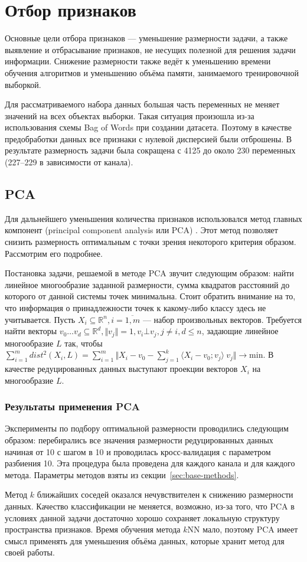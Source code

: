 \section{Отбор признаков}
Основные цели отбора признаков --- уменьшение размерности задачи, а также выявление и отбрасывание признаков, не несущих полезной для решения задачи информации. Снижение размерности также ведёт к уменьшению времени обучения алгоритмов и уменьшению объёма памяти, занимаемого тренировочной выборкой.
 \par
Для рассматриваемого набора данных большая часть переменных не меняет значений на всех объектах выборки. Такая ситуация произошла из-за использования схемы Bag of Words при создании датасета. Поэтому в качестве предобработки данных все признаки с нулевой дисперсией были отброшены. В результате размерность задачи была сокращена с 4125 до около 230 переменных (227--229 в зависимости от канала). 
\subsection{PCA}
Для дальнейшего уменьшения количества признаков использовался метод главных компонент (principal component analysis или PCA) \cite{pearson}. Этот метод позволяет снизить размерность оптимальным с точки зрения некоторого критерия образом. Рассмотрим его подробнее.
 \par
 Постановка задачи, решаемой в методе PCA звучит следующим образом: найти линейное многообразие заданной  размерности, сумма квадратов расстояний до которого от данной системы точек минимальна. Стоит обратить внимание на то, что информация о принадлежности точек к какому-либо классу здесь не учитывается. Пусть \( X_i \subseteq \mathbb{R}^n, i=\overline{1,m} \) --- набор произвольных векторов. Требуется найти векторы \(v_0\ldots v_d\subseteq \mathbb{R}^d, \Vert v_j \Vert = 1, v_i \bot v_j, j \neq  i, d \leq n\), задающие линейное многообразие \(L\) так, чтобы \( \sum_{i=1}^{m} dist^2(X_i, L) = \sum_{i=1}^{m}\Vert X_i - v_0 - \sum_{j=1}^k\langle X_i - v_0; v_j\rangle\ v_j \Vert\rightarrow \mathrm{min}\). В качестве редуцированных данных выступают проекции векторов \( X_i\) на многообразие \(L\). 
  
 \subsubsection*{Результаты применения PCA}
 Эксперименты по подбору оптимальной размерности проводились следующим образом: перебирались все значения 
 размерности редуцированных данных начиная от 10 с шагом в 10 и проводилась кросс-валидация с параметром разбиения 10. Эта процедура была проведена для каждого канала и для каждого метода. Параметры методов 
 взяты из секции~\ref{sec:base-methods}.
\par
Метод \(k\) ближайших соседей оказался нечувствителен к снижению размерности данных. Качество классификации не меняется, возможно, из-за того, что PCA в условиях данной задачи достаточно хорошо сохраняет локальную структуру пространства признаков. Время обучения метода \(k\)NN мало, поэтому PCA
имеет смысл применять для уменьшения объёма данных, которые хранит метод для своей работы.


